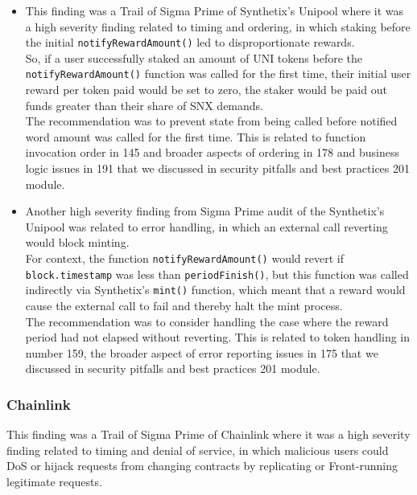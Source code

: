 \begin{itemize}
\item
  This finding was a Trail of Sigma Prime of Synthetix's Unipool where
  it was a high severity finding related to timing and ordering, in
  which staking before the initial \texttt{notifyRewardAmount()} led to
  disproportionate rewards.\\

  So, if a user successfully staked an amount of UNI tokens before the
  \texttt{notifyRewardAmount()} function was called for the first time,
  their initial user reward per token paid would be set to zero, the
  staker would be paid out funds greater than their share of SNX
  demands.\\

  The recommendation was to prevent state from being called before
  notified word amount was called for the first time. This is related to
  function invocation order in 145 and broader aspects of ordering in
  178 and business logic issues in 191 that we discussed in security
  pitfalls and best practices 201 module.
\item
  Another high severity finding from Sigma Prime audit of the
  Synthetix's Unipool was related to error handling, in which an
  external call reverting would block minting.\\

  For context, the function \texttt{notifyRewardAmount()} would revert
  if \texttt{block.timestamp} was less than \texttt{periodFinish()}, but
  this function was called indirectly via Synthetix's \texttt{mint()}
  function, which meant that a reward would cause the external call to
  fail and thereby halt the mint process.\\

  The recommendation was to consider handling the case where the reward
  period had not elapsed without reverting. This is related to token
  handling in number 159, the broader aspect of error reporting issues
  in 175 that we discussed in security pitfalls and best practices 201
  module.
\end{itemize}

\subsubsection{Chainlink}\label{chainlink}

This finding was a Trail of Sigma Prime of Chainlink where it was a high
severity finding related to timing and denial of service, in which
malicious users could DoS or hijack requests from changing contracts by
replicating or Front-running legitimate requests.

